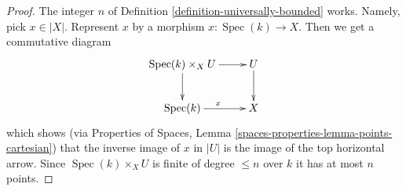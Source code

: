 \documentclass{stacks-project}
\theoremstyle{plain}
\theoremstyle{definition}
\theoremstyle{remark}
\numberwithin{equation}{subsection}
\def\Spec{\mathop{\mathrm{Spec}}}
\begin{document}
\begin{proof}
The integer $n$ of Definition \ref{definition-universally-bounded} works.
Namely, pick $x \in |X|$. Represent $x$ by a morphism
$x : \Spec(k) \to X$. Then we get a commutative diagram
$$
\xymatrix{
\Spec(k) \times_X U \ar[r] \ar[d] & U \ar[d] \\
\Spec(k) \ar[r]^x & X
}
$$
which shows (via
Properties of Spaces,
Lemma \ref{spaces-properties-lemma-points-cartesian})
that the inverse image of $x$ in $|U|$ is the image of
the top horizontal arrow. Since $\Spec(k) \times_X U$ is finite
of degree $\leq n$ over $k$ it has at most $n$ points.
\end{proof}
\end{document}
